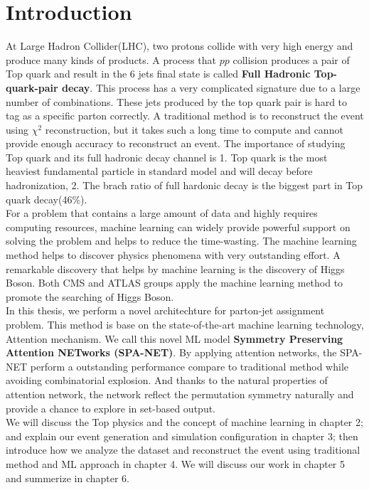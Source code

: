 
\chapter{Introduction} 

\newcommand{\comment}[1]{}

At Large Hadron Collider(LHC), two protons collide with very high energy and produce many kinds of products. A process that $pp$ collision produces a pair of Top quark and result in the 6 jets final state is called \textbf{Full Hadronic Top-quark-pair decay}. This process has a very complicated signature due to a large number of combinations. These jets produced by the top quark pair is hard to tag as a specific parton correctly. A traditional method is to reconstruct the event using $\chi^{2}$ reconstruction, but it takes such a long time to compute and cannot provide enough accuracy to reconstruct an event. The importance of studying Top quark and its full hadronic decay channel is 1. Top quark is the most heaviest  fundamental particle in standard model and will decay before hadronization, 2. The brach ratio of full hardonic decay is the biggest part in Top quark decay(46\%). 
\\
For a problem that contains a large amount of data and highly requires computing resources, machine learning can widely provide powerful support on solving the problem and helps to reduce the time-wasting. The machine learning method helps to discover physics phenomena with very outstanding effort. A remarkable discovery that helps by machine learning is the discovery of Higgs Boson. Both CMS and ATLAS groups apply the machine learning method to promote the searching of Higgs Boson. \cite{Aad:2012tfa}\cite{Chatrchyan:2012ufa}
\\
In this thesis, we perform a novel architechture for parton-jet assignment problem. This method is base on the state-of-the-art machine learning technology, Attention mechanism. We call this novel ML model \textbf{Symmetry Preserving Attention NETworks (SPA-NET)}. By applying attention networks, the SPA-NET perform a outstanding performance compare to traditional method while avoiding combinatorial explosion. And thanks to the natural properties of attention network, the 
network reflect the permutation symmetry naturally and provide a chance to explore in set-based output. 
\\
We will discuss the Top physics and the concept of machine learning in chapter 2; and explain our event generation and simulation configuration in chapter 3; then introduce how we analyze the dataset and reconstruct the event using traditional method and ML approach in chapter 4. We will discuss our work in chapter 5 and summerize in chapter 6.

